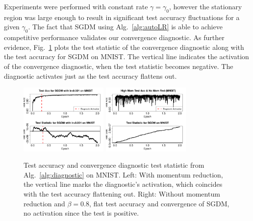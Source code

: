 \documentclass[conference]{IEEEtran}
\begin{document}
Experiments were performed with constant rate $\gamma = \gamma_0$, however the stationary region was large enough to result in significant test accuracy fluctuations for a given $\gamma_0$.
The fact that SGDM using Alg.~\ref{alg:autoLR} is able to achieve competitive performance validates our convergence diagnostic. 
As further evidence, Fig.~\ref{fig:mnist_ablation} plots the test statistic of the convergence diagnostic along with the test accuracy for SGDM on MNIST.
The vertical line indicates the activation of the convergence diagnostic, when the test statistic becomes negative. 
The diagnostic activates just as the test accuracy flattens out.

\begin{figure}[ht]
\begin{center}
\includegraphics[width=1.7in]{fig/RFig3_Stat.pdf}
  \includegraphics[width=1.7in]{fig/RFig6_ablation.pdf}\hspace{-0.12in}
\end{center}
\vspace{-0.15in}
  \caption{Test accuracy and convergence diagnostic test statistic from Alg.~\ref{alg:diagnostic} on MNIST. 
Left: With momentum reduction, the vertical line marks the diagnostic's activation, which coincides with the test accuracy flattening out.  
Right: Without momentum reduction and $\beta = 0.8$, flat test accuracy and convergence of SGDM, no activation since the test is positive.
  }
\label{fig:mnist_ablation}
\end{figure}
\end{document}
